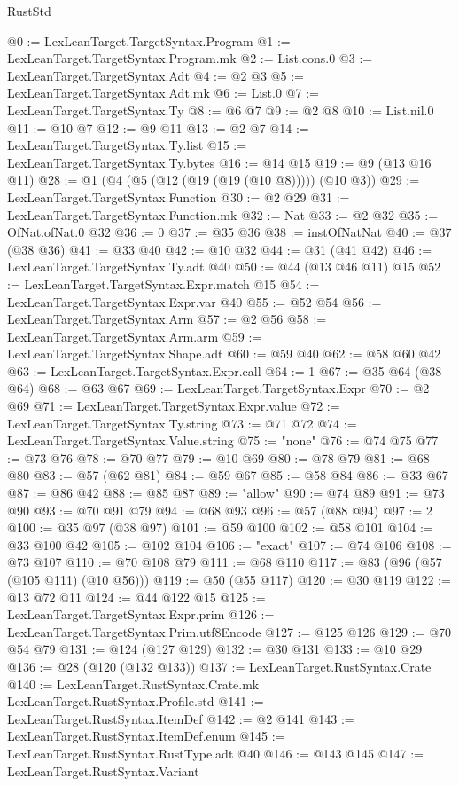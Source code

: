 \begin{lexlean}{RustStd}
\begin{coremodule}
@0 := LexLeanTarget.TargetSyntax.Program
@1 := LexLeanTarget.TargetSyntax.Program.mk
@2 := List.cons.{0}
@3 := LexLeanTarget.TargetSyntax.Adt
@4 := @2 @3
@5 := LexLeanTarget.TargetSyntax.Adt.mk
@6 := List.{0}
@7 := LexLeanTarget.TargetSyntax.Ty
@8 := @6 @7
@9 := @2 @8
@10 := List.nil.{0}
@11 := @10 @7
@12 := @9 @11
@13 := @2 @7
@14 := LexLeanTarget.TargetSyntax.Ty.list
@15 := LexLeanTarget.TargetSyntax.Ty.bytes
@16 := @14 @15
@19 := @9 (@13 @16 @11)
@28 := @1 (@4 (@5 (@12 (@19 (@19 (@10 @8))))) (@10 @3))
@29 := LexLeanTarget.TargetSyntax.Function
@30 := @2 @29
@31 := LexLeanTarget.TargetSyntax.Function.mk
@32 := Nat
@33 := @2 @32
@35 := OfNat.ofNat.{0} @32
@36 := 0
@37 := @35 @36
@38 := instOfNatNat
@40 := @37 (@38 @36)
@41 := @33 @40
@42 := @10 @32
@44 := @31 (@41 @42)
@46 := LexLeanTarget.TargetSyntax.Ty.adt @40
@50 := @44 (@13 @46 @11) @15
@52 := LexLeanTarget.TargetSyntax.Expr.match @15
@54 := LexLeanTarget.TargetSyntax.Expr.var @40
@55 := @52 @54
@56 := LexLeanTarget.TargetSyntax.Arm
@57 := @2 @56
@58 := LexLeanTarget.TargetSyntax.Arm.arm
@59 := LexLeanTarget.TargetSyntax.Shape.adt
@60 := @59 @40
@62 := @58 @60 @42
@63 := LexLeanTarget.TargetSyntax.Expr.call
@64 := 1
@67 := @35 @64 (@38 @64)
@68 := @63 @67
@69 := LexLeanTarget.TargetSyntax.Expr
@70 := @2 @69
@71 := LexLeanTarget.TargetSyntax.Expr.value
@72 := LexLeanTarget.TargetSyntax.Ty.string
@73 := @71 @72
@74 := LexLeanTarget.TargetSyntax.Value.string
@75 := "none"
@76 := @74 @75
@77 := @73 @76
@78 := @70 @77
@79 := @10 @69
@80 := @78 @79
@81 := @68 @80
@83 := @57 (@62 @81)
@84 := @59 @67
@85 := @58 @84
@86 := @33 @67
@87 := @86 @42
@88 := @85 @87
@89 := "allow"
@90 := @74 @89
@91 := @73 @90
@93 := @70 @91 @79
@94 := @68 @93
@96 := @57 (@88 @94)
@97 := 2
@100 := @35 @97 (@38 @97)
@101 := @59 @100
@102 := @58 @101
@104 := @33 @100 @42
@105 := @102 @104
@106 := "exact"
@107 := @74 @106
@108 := @73 @107
@110 := @70 @108 @79
@111 := @68 @110
@117 := @83 (@96 (@57 (@105 @111) (@10 @56)))
@119 := @50 (@55 @117)
@120 := @30 @119
@122 := @13 @72 @11
@124 := @44 @122 @15
@125 := LexLeanTarget.TargetSyntax.Expr.prim
@126 := LexLeanTarget.TargetSyntax.Prim.utf8Encode
@127 := @125 @126
@129 := @70 @54 @79
@131 := @124 (@127 @129)
@132 := @30 @131
@133 := @10 @29
@136 := @28 (@120 (@132 @133))
@137 := LexLeanTarget.RustSyntax.Crate
@140 := LexLeanTarget.RustSyntax.Crate.mk LexLeanTarget.RustSyntax.Profile.std
@141 := LexLeanTarget.RustSyntax.ItemDef
@142 := @2 @141
@143 := LexLeanTarget.RustSyntax.ItemDef.enum
@145 := LexLeanTarget.RustSyntax.RustType.adt @40
@146 := @143 @145
@147 := LexLeanTarget.RustSyntax.Variant

\end{coremodule}
\end{lexlean}
